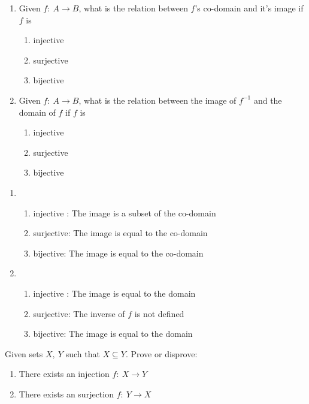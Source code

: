 \documentclass[12pt]{article}
\newenvironment{solution}[2][Solution]{ \begin{trivlist}
\item[\hskip \labelsep {\bfseries #1}]}{\end{trivlist}}
\newenvironment{problem}[2][Problem]{\begin{trivlist}
\item[\hskip \labelsep {\bfseries #1}\hskip \labelsep {\bfseries #2.}]}{\end{trivlist}}
\begin{document}
\begin{problem}{3}
\item[]
\begin{enumerate}[label=\alph*)]
    \item Given $ f \colon \ A \longrightarrow B$, what is the relation between $f$'s co-domain and it's image if $f$ is 
    \begin{enumerate}[label=(\roman*)]
    \item injective
    \item surjective
    \item bijective
    \end{enumerate}
    \item Given $ f \colon \ A \longrightarrow B$, what is the relation between the image of $f^{-1}$ and the domain of $f$ if $f$ is 
    \begin{enumerate}[label=(\roman*)]
    \item injective
    \item surjective
    \item bijective
    \end{enumerate}
\end{enumerate}
\end{problem}
\begin{solution}{3}
\item[]
\begin{enumerate}[label=\alph*)]
\item
    \begin{enumerate}[label=(\roman*)]
        \item injective : The image is a subset of the co-domain
        \item surjective: The image is equal to the co-domain
        \item bijective: The image is equal to the co-domain
        \end{enumerate}
\item
    \begin{enumerate}[label=(\roman*)]
        \item injective : The image is equal to the domain
        \item surjective: The inverse of $f$ is not defined
        \item bijective: The image is equal to the domain
        \end{enumerate}
\end{enumerate}
\end{solution}
\vskip 0.5in
\begin{problem}{4} Given sets $X,\ Y$ such that $X \subseteq Y$. Prove or disprove:
\begin{enumerate}[label=\alph*)]
    \item There exists an injection $ f \colon \ X \longrightarrow Y$
    \item There exists an surjection $ f \colon \ Y \longrightarrow X$
\end{enumerate}
\end{problem}
\end{document}
